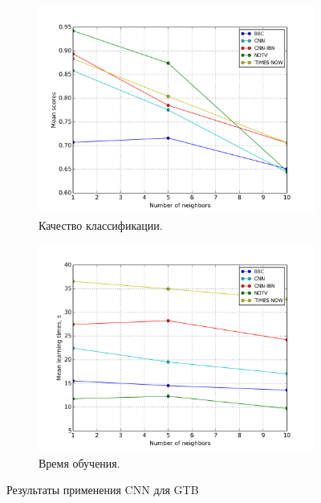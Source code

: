 \begin{figure}
	\centering
	\begin{subfigure}{0.45\textwidth}
		\includegraphics[width=\textwidth]{images/cnn-gradboosting.png}
		\caption{Качество классификации.}
	\end{subfigure}
	\begin{subfigure}{0.45\textwidth}
		\includegraphics[width=\textwidth]{images/cnn-gradboostingTime.png}
		\caption{Время обучения.}
	\end{subfigure}
	\caption{Результаты применения CNN для GTB}\label{fig:cnn-gtb-results}
\end{figure}

